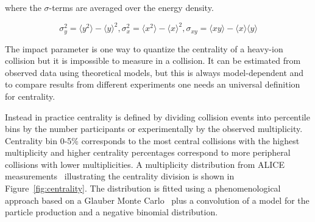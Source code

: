 \noindent where the $\sigma$-terms are averaged over the energy density.

\begin{equation}
\sigma_y^2=\langle y^2\rangle-\langle y \rangle ^2, \sigma_x^2=\langle x^2\rangle-\langle x \rangle ^2, \sigma_{xy}=\langle xy \rangle - \langle x \rangle \langle y \rangle
\end{equation}

The impact parameter is one way to quantize the centrality of a heavy-ion collision but it is impossible to measure in a collision. It can be estimated from observed data using theoretical models, but this is always model-dependent and to compare results from different experiments one needs an universal definition for centrality. %






Instead in practice centrality is defined by dividing collision events into percentile bins by the number participants or experimentally by the observed multiplicity. Centrality bin 0-5\% corresponds to the most central collisions with the highest multiplicity and higher centrality percentages correspond to more peripheral collisions with lower multiplicities. A multiplicity distribution from ALICE measurements~\cite{PhysRevC.88.044909} illustrating the centrality division is shown in Figure~\ref{fig:centrality}. The distribution is fitted using a phenomenological approach based on a Glauber Monte Carlo~\cite{Miller:2007ri} plus a convolution of a model for the particle production and a negative binomial distribution. 


